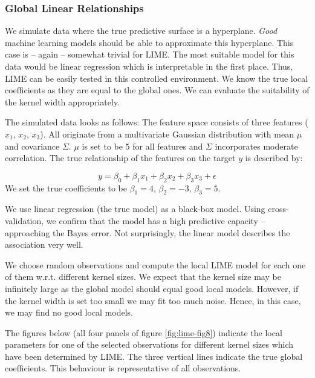 \documentclass[]{krantz}
\begin{document}
\subsubsection{Global Linear Relationships}\label{id411}

We simulate data where the true predictive surface is a hyperplane.
\emph{Good} machine learning models should be able to approximate this
hyperplane. This case is -- again -- somewhat trivial for LIME. The most
suitable model for this data would be linear regression which is
interpretable in the first place. Thus, LIME can be easily tested in
this controlled environment. We know the true local coefficients as they
are equal to the global ones. We can evaluate the suitability of the
kernel width appropriately.

The simulated data looks as follows: The feature space consists of three
features (\(x_1\), \(x_2\), \(x_3\)). All originate from a multivariate
Gaussian distribution with mean \(\mu\) and covariance \(\Sigma\).
\(\mu\) is set to be \(5\) for all features and \(\Sigma\) incorporates
moderate correlation. The true relationship of the features on the
target \(y\) is described by:

\[ y = \beta_0 + \beta_1 x_1 + \beta_2 x_2 + \beta_3 x_3 + \epsilon \]
We set the true coefficients to be \(\beta_1 = 4\), \(\beta_2 = -3\),
\(\beta_3 = 5\).

We use linear regression (the true model) as a black-box model. Using
cross-validation, we confirm that the model has a high predictive
capacity -- approaching the Bayes error. Not surprisingly, the linear
model describes the association very well.

We choose random observations and compute the local LIME model for each
one of them w.r.t. different kernel sizes. We expect that the kernel
size may be infinitely large as the global model should equal good local
models. However, if the kernel width is set too small we may fit too
much noise. Hence, in this case, we may find no good local models.

The figures below (all four panels of figure \ref{fig:lime-fig8})
indicate the local parameters for one of the selected observations for
different kernel sizes which have been determined by LIME. The three
vertical lines indicate the true global coefficients. This behaviour is
representative of all observations.
\end{document}
